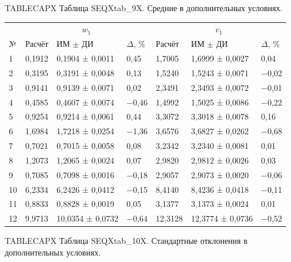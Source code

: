 \noindent TABLECAPX Таблица SEQXtab_9X. Средние в дополнительных условиях.\par

\setlength{\tabcolsep}{2pt}
\begin{tabular}{p{1.5cm}p{1.9cm}p{3.4cm}p{1.4cm}p{1.9cm}p{3.4cm}p{1.4cm}}
\toprule
 & \multicolumn{3}{c}{$w_1$} & \multicolumn{3}{c}{$v_1$} \\
№ & Расчёт & ИМ $\pm$ ДИ & $\Delta$, \% & Расчёт & ИМ $\pm$ ДИ & $\Delta$, \% \\
\midrule
1 & 0,1912 & 0,1904 ± 0,0011 & 0,45 & 1,7005 & 1,6999 ± 0,0027 & 0,04 \\
2 & 0,3195 & 0,3191 ± 0,0048 & 0,13 & 1,5240 & 1,5243 ± 0,0071 & −0,02 \\
3 & 0,9141 & 0,9139 ± 0,0071 & 0,02 & 2,3491 & 2,3493 ± 0,0072 & −0,01 \\
4 & 0,4585 & 0,4607 ± 0,0074 & −0,46 & 1,4992 & 1,5025 ± 0,0086 & −0,22 \\
5 & 0,9254 & 0,9214 ± 0,0061 & 0,44 & 3,3072 & 3,3018 ± 0,0078 & 0,16 \\
6 & 1,6984 & 1,7218 ± 0,0254 & −1,36 & 3,6576 & 3,6827 ± 0,0262 & −0,68 \\
7 & 0,7021 & 0,7015 ± 0,0058 & 0,08 & 3,2342 & 3,2340 ± 0,0081 & 0,01 \\
8 & 1,2073 & 1,2065 ± 0,0024 & 0,07 & 2,9820 & 2,9812 ± 0,0026 & 0,03 \\
9 & 0,7085 & 0,7098 ± 0,0016 & −0,18 & 2,9057 & 2,9073 ± 0,0020 & −0,06 \\
10 & 6,2334 & 6,2426 ± 0,0412 & −0,15 & 8,4140 & 8,4236 ± 0,0418 & −0,11 \\
11 & 0,8833 & 0,8828 ± 0,0019 & 0,05 & 3,1377 & 3,1373 ± 0,0024 & 0,01 \\
12 & 9,9713 & 10,0354 ± 0,0732 & −0,64 & 12,3128 & 12,3774 ± 0,0736 & −0,52 \\
\bottomrule
\end{tabular}




\noindent TABLECAPX Таблица SEQXtab_10X. Стандартные отклонения в дополнительных условиях.\par

